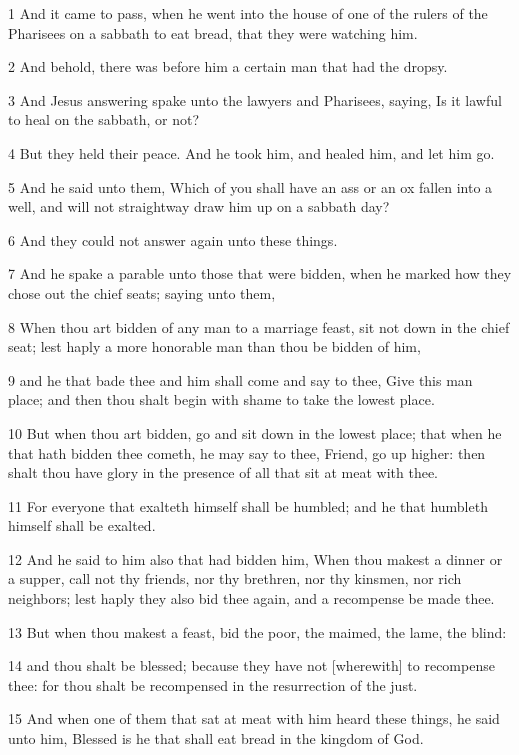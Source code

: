 \par 1 And it came to pass, when he went into the house of one of the rulers of the Pharisees on a sabbath to eat bread, that they were watching him.
\par 2 And behold, there was before him a certain man that had the dropsy.
\par 3 And Jesus answering spake unto the lawyers and Pharisees, saying, Is it lawful to heal on the sabbath, or not?
\par 4 But they held their peace. And he took him, and healed him, and let him go.
\par 5 And he said unto them, Which of you shall have an ass or an ox fallen into a well, and will not straightway draw him up on a sabbath day?
\par 6 And they could not answer again unto these things.
\par 7 And he spake a parable unto those that were bidden, when he marked how they chose out the chief seats; saying unto them,
\par 8 When thou art bidden of any man to a marriage feast, sit not down in the chief seat; lest haply a more honorable man than thou be bidden of him,
\par 9 and he that bade thee and him shall come and say to thee, Give this man place; and then thou shalt begin with shame to take the lowest place.
\par 10 But when thou art bidden, go and sit down in the lowest place; that when he that hath bidden thee cometh, he may say to thee, Friend, go up higher: then shalt thou have glory in the presence of all that sit at meat with thee.
\par 11 For everyone that exalteth himself shall be humbled; and he that humbleth himself shall be exalted.
\par 12 And he said to him also that had bidden him, When thou makest a dinner or a supper, call not thy friends, nor thy brethren, nor thy kinsmen, nor rich neighbors; lest haply they also bid thee again, and a recompense be made thee.
\par 13 But when thou makest a feast, bid the poor, the maimed, the lame, the blind:
\par 14 and thou shalt be blessed; because they have not [wherewith] to recompense thee: for thou shalt be recompensed in the resurrection of the just.
\par 15 And when one of them that sat at meat with him heard these things, he said unto him, Blessed is he that shall eat bread in the kingdom of God.
